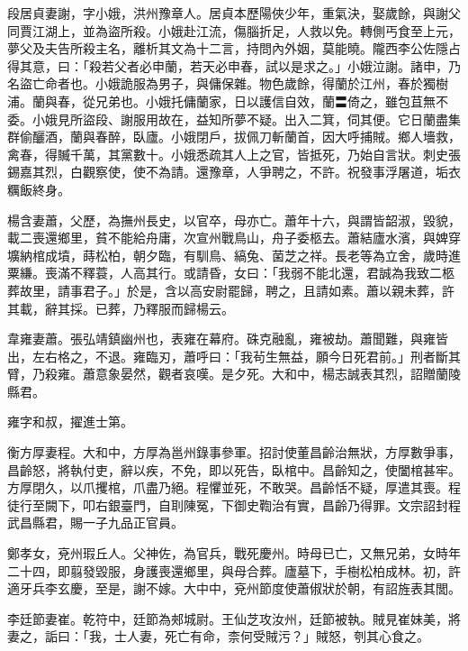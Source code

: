 \begin{pinyinscope}
 段居貞妻謝，字小娥，洪州豫章人。居貞本歷陽俠少年，重氣決，娶歲餘，與謝父同賈江湖上，並為盜所殺。小娥赴江流，傷腦折足，人救以免。轉側丐食至上元，夢父及夫告所殺主名，離析其文為十二言，持問內外姻，莫能曉。隴西李公佐隱占得其意，曰：「殺若父者必申蘭，若天必申春，試以是求之。」小娥泣謝。諸申，乃名盜亡命者也。小娥詭服為男子，與傭保雜。物色歲餘，得蘭於江州，春於獨樹浦。蘭與春，從兄弟也。小娥托傭蘭家，日以護信自效，蘭〓倚之，雖包苴無不委。小娥見所盜段、謝服用故在，益知所夢不疑。出入二箕，伺其便。它日蘭盡集群偷釃酒，蘭與春醉，臥廬。小娥閉戶，拔佩刀斬蘭首，因大呼捕賊。鄉人墻救，禽春，得贓千萬，其黨數十。小娥悉疏其人上之官，皆抵死，乃始自言狀。刺史張錫嘉其烈，白觀察使，使不為請。還豫章，人爭聘之，不許。祝發事浮屠道，垢衣糲飯終身。



 楊含妻蕭，父歷，為撫州長史，以官卒，母亦亡。蕭年十六，與謂皆韶淑，毀貌，載二喪還鄉里，貧不能給舟庸，次宣州戰鳥山，舟子委柩去。蕭結廬水濱，與婢穿壙納棺成墳，蒔松柏，朝夕臨，有馴鳥、縞兔、菌芝之祥。長老等為立舍，歲時進粟縑。喪滿不釋蓑，人高其行。或請昏，女曰：「我弱不能北還，君誠為我致二柩葬故里，請事君子。」於是，含以高安尉罷歸，聘之，且請如素。蕭以親未葬，許其載，辭其採。已葬，乃釋服而歸楊云。



 韋雍妻蕭。張弘靖鎮幽州也，表雍在幕府。硃克融亂，雍被劫。蕭聞難，與雍皆出，左右格之，不退。雍臨刃，蕭呼曰：「我茍生無益，願今日死君前。」刑者斷其臂，乃殺雍。蕭意象晏然，觀者哀嘆。是夕死。大和中，楊志誠表其烈，詔贈蘭陵縣君。



 雍字和叔，擢進士第。



 衡方厚妻程。大和中，方厚為邕州錄事參軍。招討使董昌齡治無狀，方厚數爭事，昌齡怒，將執付吏，辭以疾，不免，即以死告，臥棺中。昌齡知之，使闔棺甚牢。方厚閉久，以爪攫棺，爪盡乃絕。程懼並死，不敢哭。昌齡恬不疑，厚遣其喪。程徒行至闕下，叩右銀臺門，自刵陳冤，下御史鞫治有實，昌齡乃得罪。文宗詔封程武昌縣君，賜一子九品正官員。



 鄭孝女，兗州瑕丘人。父神佐，為官兵，戰死慶州。時母已亡，又無兄弟，女時年二十四，即翦發毀服，身護喪還鄉里，與母合葬。廬墓下，手樹松柏成林。初，許適牙兵李玄慶，至是，謝不嫁。大中中，兗州節度使蕭俶狀於朝，有詔旌表其閭。



 李廷節妻崔。乾符中，廷節為郟城尉。王仙芝攻汝州，廷節被執。賊見崔妹美，將妻之，詬曰：「我，士人妻，死亡有命，柰何受賊污？」賊怒，刳其心食之。




\end{pinyinscope}
